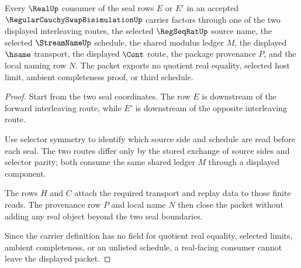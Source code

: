 \begin{theorem}
\label{thm:regular-cauchy-swap-bisimulation-real-seal-nonescape}
Every $\RealUp$ consumer of the seal rows $E$ or $E'$ in an accepted $\RegularCauchySwapBisimulationUp$ carrier factors through one of the two displayed interleaving routes, the selected $\RegSeqRatUp$ source name, the selected $\StreamNameUp$ schedule, the shared modulus ledger $M$, the displayed $\hsame$ transport, the displayed $\Cont$ route, the package provenance $P$, and the local naming row $N$. The packet exports no quotient real equality, selected host limit, ambient completeness proof, or third schedule.
\end{theorem}
\begin{proof}
Start from the two seal coordinates. The row $E$ is downstream of the forward interleaving route, while $E'$ is downstream of the opposite interleaving route.

Use selector symmetry to identify which source side and schedule are read before each seal. The two routes differ only by the stored exchange of source sides and selector parity; both consume the same shared ledger $M$ through a displayed component.

The rows $H$ and $C$ attach the required transport and replay data to those finite reads. The provenance row $P$ and local name $N$ then close the packet without adding any real object beyond the two seal boundaries.

Since the carrier definition has no field for quotient real equality, selected limits, ambient completeness, or an unlisted schedule, a real-facing consumer cannot leave the displayed packet.
\end{proof}

